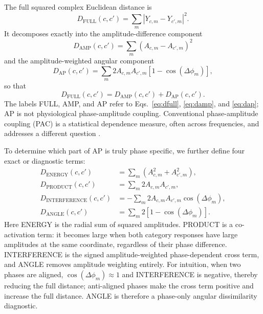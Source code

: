 \documentclass[11pt]{article}
\newcommand{\DFULL}{D_{\mathrm{FULL}}}
\newcommand{\DAP}{D_{\mathrm{AP}}}
\newcommand{\DAMP}{D_{\mathrm{AMP}}}
\newcommand{\DINT}{D_{\mathrm{INTERFERENCE}}}
\newcommand{\DANG}{D_{\mathrm{ANGLE}}}
\begin{document}
The full squared complex Euclidean distance is
\begin{equation}
\DFULL(c,c')=\sum_m|Y_{c,m}-Y_{c',m}|^2.
\label{eq:dfull}
\end{equation}
It decomposes exactly into the amplitude-difference component
\begin{equation}
\DAMP(c,c')=\sum_m(A_{c,m}-A_{c',m})^2
\label{eq:damp}
\end{equation}
and the amplitude-weighted angular component
\begin{equation}
\DAP(c,c')=\sum_m2A_{c,m}A_{c',m}\left[1-\cos(\Delta\phi_m)\right],
\label{eq:dap}
\end{equation}
so that
\begin{equation}
\DFULL(c,c')=\DAMP(c,c')+\DAP(c,c').
\label{eq:fullapamp}
\end{equation}
The labels FULL, AMP, and AP refer to Eqs.~\ref{eq:dfull}, \ref{eq:damp}, and \ref{eq:dap}; AP is not physiological phase-amplitude coupling. Conventional phase-amplitude coupling (PAC) is a statistical dependence measure, often across frequencies, and addresses a different question \citep{Kovach2018}.

To determine which part of AP is truly phase specific, we further define four exact or diagnostic terms:
\begin{align}
D_{\mathrm{ENERGY}}(c,c')
&=\sum_m\left(A_{c,m}^2+A_{c',m}^2\right),
\label{eq:energy}\\
D_{\mathrm{PRODUCT}}(c,c')
&=\sum_m2A_{c,m}A_{c',m},
\label{eq:product}\\
\DINT(c,c')
&=-\sum_m2A_{c,m}A_{c',m}\cos(\Delta\phi_m),
\label{eq:interference}\\
\DANG(c,c')
&=\sum_m2\left[1-\cos(\Delta\phi_m)\right].
\label{eq:angle}
\end{align}
Here ENERGY is the radial sum of squared amplitudes. PRODUCT is a co-activation term: it becomes large when both category responses have large amplitudes at the same coordinate, regardless of their phase difference. INTERFERENCE is the signed amplitude-weighted phase-dependent cross term, and ANGLE removes amplitude weighting entirely. For intuition, when two phases are aligned, $\cos(\Delta\phi_m)\approx1$ and INTERFERENCE is negative, thereby reducing the full distance; anti-aligned phases make the cross term positive and increase the full distance. ANGLE is therefore a phase-only angular dissimilarity diagnostic.
\end{document}
